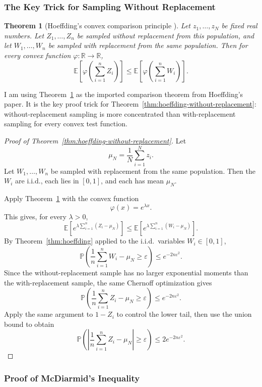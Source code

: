 \documentclass{article}
\newtheorem{theorem}{Theorem}[section]
\theoremstyle{definition}
\theoremstyle{remark}
\newcommand{\EE}{\mathbb{E}}
\newcommand{\PP}{\mathbb{P}}
\begin{document}
\subsubsection{The Key Trick for Sampling Without Replacement}

\begin{theorem}[Hoeffding's convex comparison principle \cite{Hoeffding1963}]
\label{thm:hoeffding-comparison}
Let $z_1,\dots,z_N$ be fixed real numbers. Let $Z_1,\dots,Z_n$ be sampled without replacement from this population, and let $W_1,\dots,W_n$ be sampled with replacement from the same population. Then for every convex function $\varphi:\mathbb{R}\to\mathbb{R}$,
$$
\EE\!\left[\varphi\!\left(\sum_{i=1}^n Z_i\right)\right]
\le
\EE\!\left[\varphi\!\left(\sum_{i=1}^n W_i\right)\right].
$$
\end{theorem}

I am using Theorem~\ref{thm:hoeffding-comparison} as the imported comparison theorem from Hoeffding's paper. It is the key proof trick for Theorem~\ref{thm:hoeffding-without-replacement}: without-replacement sampling is more concentrated than with-replacement sampling for every convex test function.

\begin{proof}[Proof of Theorem~\ref{thm:hoeffding-without-replacement}]
Let
$$
\mu_N = \frac{1}{N}\sum_{i=1}^N z_i.
$$
Let $W_1,\dots,W_n$ be sampled with replacement from the same population. Then the $W_i$ are i.i.d., each lies in $[0,1]$, and each has mean $\mu_N$.

Apply Theorem~\ref{thm:hoeffding-comparison} with the convex function
$$
\varphi(x)=e^{\lambda x}.
$$
This gives, for every $\lambda>0$,
$$
\EE\!\left[
e^{\lambda \sum_{i=1}^n (Z_i-\mu_N)}
\right]
\le
\EE\!\left[
e^{\lambda \sum_{i=1}^n (W_i-\mu_N)}
\right].
$$
By Theorem~\ref{thm:hoeffding} applied to the i.i.d.\ variables $W_i \in [0,1]$,
$$
\PP\!\left(
\frac{1}{n}\sum_{i=1}^n W_i - \mu_N \ge \varepsilon
\right)
\le
e^{-2n\varepsilon^2}.
$$
Since the without-replacement sample has no larger exponential moments than the with-replacement sample, the same Chernoff optimization gives
$$
\PP\!\left(
\frac{1}{n}\sum_{i=1}^n Z_i - \mu_N \ge \varepsilon
\right)
\le
e^{-2n\varepsilon^2}.
$$
Apply the same argument to $1-Z_i$ to control the lower tail, then use the union bound to obtain
$$
\PP\!\left(
\left|
\frac{1}{n}\sum_{i=1}^n Z_i - \mu_N
\right|
\ge
\varepsilon
\right)
\le
2e^{-2n\varepsilon^2}.
$$
\end{proof}

\subsubsection{Proof of McDiarmid's Inequality}
\end{document}
